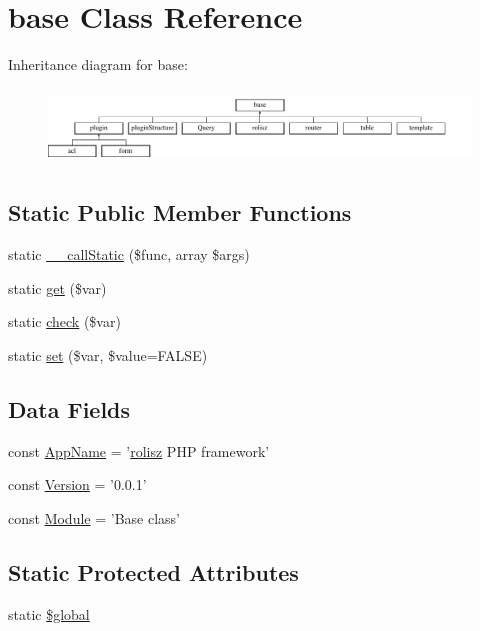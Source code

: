 \hypertarget{classbase}{
\section{base Class Reference}
\label{classbase}
}
Inheritance diagram for base:\begin{figure}[H]
\begin{center}
\leavevmode
\includegraphics[height=2.000000cm]{classbase}
\end{center}
\end{figure}
\subsection*{Static Public Member Functions}
\begin{DoxyCompactItemize}
\item 
static \hyperlink{classbase_a9fa8e32de2139fd5e55c102dcdf9120f}{\_\-\_\-callStatic} (\$func, array \$args)
\item 
static \hyperlink{classbase_a0e8f3e2708d9f0c6ee7b54599f57ea34}{get} (\$var)
\item 
static \hyperlink{classbase_ae09ec448121b7c739ecd283675056e1f}{check} (\$var)
\item 
static \hyperlink{classbase_adc76e59111cb34cf88726e6f3bd0be8b}{set} (\$var, \$value=FALSE)
\end{DoxyCompactItemize}
\subsection*{Data Fields}
\begin{DoxyCompactItemize}
\item 
const \hyperlink{classbase_aab75444b144ffc4e972a9170e0a76ec0}{AppName} = '\hyperlink{classrolisz}{rolisz} PHP framework'
\item 
const \hyperlink{classbase_a62e44de9100d83ee01f5b4875b49a02b}{Version} = '0.0.1'
\item 
const \hyperlink{classbase_a2c348358c1db4bb5136855f7f31e1157}{Module} = 'Base class'
\end{DoxyCompactItemize}
\subsection*{Static Protected Attributes}
\begin{DoxyCompactItemize}
\item 
static \hyperlink{classbase_aad844777d9d6beb4ca7c92d97afe7d27}{\$global}
\end{DoxyCompactItemize}


